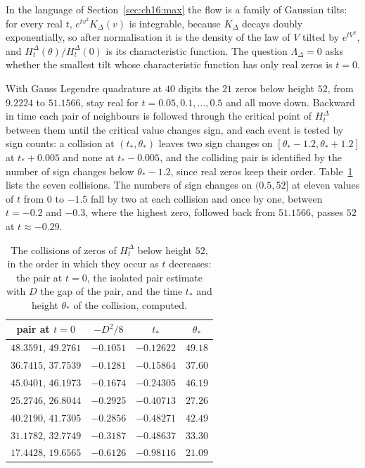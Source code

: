In the language of Section~\ref{sec:ch16:max} the flow is a family of Gaussian tilts: for every real $t$, $e^{tv^2}K_\Delta(v)$ is integrable, because $K_\Delta$ decays doubly exponentially, so after normalisation it is the density of the law of $V$ tilted by $e^{tV^2}$, and $H^\Delta_t(\theta)/H^\Delta_t(0)$ is its characteristic function. The question $\Lambda_\Delta=0$ asks whether the smallest tilt whose characteristic function has only real zeros is $t=0$.

With Gauss Legendre quadrature at $40$ digits the $21$ zeros below height $52$, from $9.2224$ to $51.1566$, stay real for $t=0.05,0.1,\dots,0.5$ and all move down. Backward in time each pair of neighbours is followed through the critical point of $H^\Delta_t$ between them until the critical value changes sign, and each event is tested by sign counts: a collision at $(t_*,\theta_*)$ leaves two sign changes on $[\theta_*-1.2,\theta_*+1.2]$ at $t_*+0.005$ and none at $t_*-0.005$, and the colliding pair is identified by the number of sign changes below $\theta_*-1.2$, since real zeros keep their order. Table~\ref{tab:ch16:coll} lists the seven collisions. The numbers of sign changes on $(0.5,52]$ at eleven values of $t$ from $0$ to $-1.5$ fall by two at each collision and once by one, between $t=-0.2$ and $-0.3$, where the highest zero, followed back from $51.1566$, passes $52$ at $t\approx-0.29$.

\begin{table}[htbp]
\centering\small
\begin{tabular}{cccc}
\toprule
pair at $t=0$ & $-D^2/8$ & $t_*$ & $\theta_*$\\
\midrule
$48.3591$, $49.2761$ & $-0.1051$ & $-0.12622$ & $49.18$\\
$36.7415$, $37.7539$ & $-0.1281$ & $-0.15864$ & $37.60$\\
$45.0401$, $46.1973$ & $-0.1674$ & $-0.24305$ & $46.19$\\
$25.2746$, $26.8044$ & $-0.2925$ & $-0.40713$ & $27.26$\\
$40.2190$, $41.7305$ & $-0.2856$ & $-0.48271$ & $42.49$\\
$31.1782$, $32.7749$ & $-0.3187$ & $-0.48637$ & $33.30$\\
$17.4428$, $19.6565$ & $-0.6126$ & $-0.98116$ & $21.09$\\
\bottomrule
\end{tabular}
\caption{The collisions of zeros of $H^\Delta_t$ below height $52$, in the order in which they occur as $t$ decreases: the pair at $t=0$, the isolated pair estimate with $D$ the gap of the pair, and the time $t_*$ and height $\theta_*$ of the collision, computed.}
\label{tab:ch16:coll}
\end{table}

